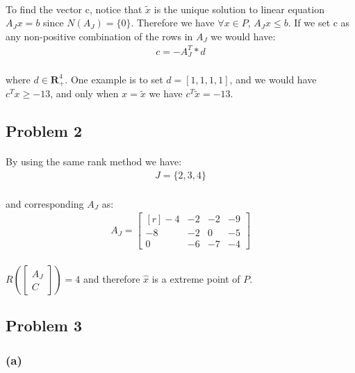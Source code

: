 \documentclass[12pt]{article}
\begin{document}
\paragraph*{}
To find the vector c, notice that $\tilde{x}$ is the unique solution to linear equation $A_J x  = b$ since $N(A_J)=\{0\}$. Therefore we have $\forall x \in P$, $A_J x \leq b$. If we set c as any non-positive combination of the rows in $A_J$ we would have:
\begin{align*}
c = - A_J^T * d
\end{align*}
\paragraph*{}
where $d \in \textbf{R}^4_+$. One example is to set $d = [1, 1, 1, 1]$, and we would have $c^T x \geq -13$, and only when $x = \tilde{x}$ we have $c^T \tilde{x} = -13$.
\subsection*{Problem 2}
\paragraph*{}
By using the same rank method we have:
\begin{align*}
J = \{ 2, 3, 4\}
\end{align*}
%
\paragraph{}
and corresponding $A_J$ as:
%
\begin{align*}
A_J = 
\begin{bmatrix*}[r]
-4&-2&-2&-9\\
-8&-2&0&-5\\
0&-6&-7&-4 
\end{bmatrix*}
\end{align*}
%
\paragraph*{}
$R(\begin{bmatrix}
A_J\\
C
\end{bmatrix}) = 4$ and therefore $\hat{x}$ is a extreme point of $P$.
\subsection*{Problem 3}
\subsubsection*{(a)}
\end{document}
